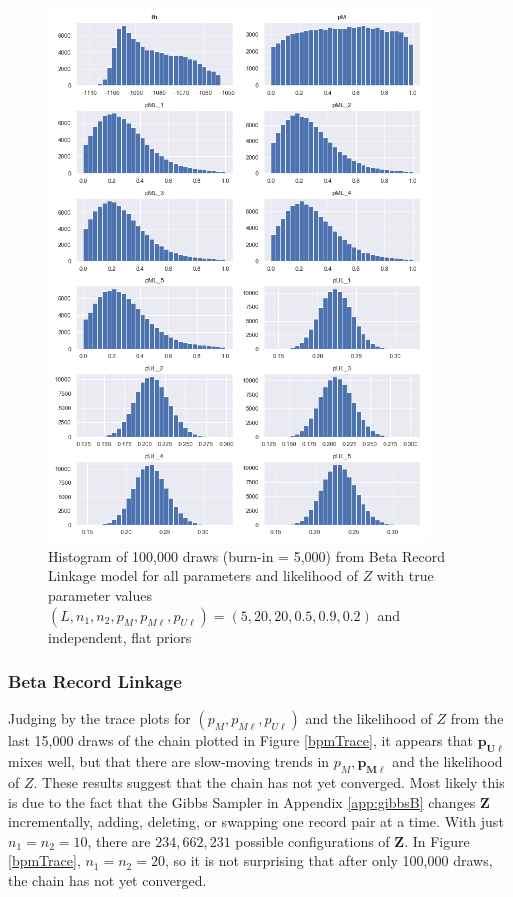 \documentclass[11pt,reqno]{amsart}
\newcommand\params{(p_M, p_{M\ell}, p_{U\ell})}
\begin{document}
\begin{figure}[htbp]
\begin{center}
\includegraphics[width=0.9\textwidth]{../Figures/bpm/nM10/allParam_nM10_L5.png}
\caption{Histogram of 100,000 draws (burn-in = 5,000) from Beta Record Linkage model for all parameters and likelihood of $Z$ with true parameter values $(L, n_1, n_2, p_M, p_{M\ell}, p_{U\ell}) = (5, 20, 20, 0.5, 0.9, 0.2)$ and independent, flat priors}
\label{bpmLarge}
\end{center}
\end{figure}

\subsubsection{Beta Record Linkage}  Judging by the trace plots for $\params$ and the likelihood of $Z$ from the last 15,000 draws of the chain plotted in Figure \ref{bpmTrace}, it appears that $\mathbf{p_{U\ell}}$ mixes well, but that there are slow-moving trends in $p_M, \mathbf{p_{M\ell}}$ and the likelihood of $Z$.  These results suggest that the chain has not yet converged.  Most likely this is due to the fact that the Gibbs Sampler in Appendix \ref{app:gibbsB} changes $\mathbf{Z}$ incrementally, adding, deleting, or swapping one record pair at a time.  With just $n_1=n_2=10$, there are $234,662,231$ possible configurations of $\mathbf{Z}$.  In Figure \ref{bpmTrace}, $n_1=n_2=20$, so it is not surprising that after only 100,000 draws, the chain has not yet converged. 
\end{document}
